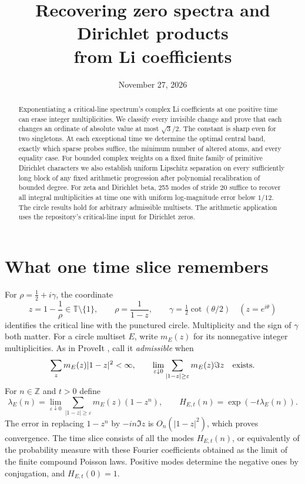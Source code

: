 \documentclass[11pt,letterpaper]{article}
\title{Recovering zero spectra and Dirichlet products\\from Li coefficients}
\author{}\date{November 27, 2026}
\newcommand{\Z}{\mathbb Z}
\newcommand{\T}{\mathbb T}
\begin{document}
\maketitle
\begin{abstract}
Exponentiating a critical-line spectrum's complex Li coefficients at one positive time can erase integer multiplicities. We classify every invisible change and prove that each changes an ordinate of absolute value at most $\sqrt3/2$. The constant is sharp even for two singletons. At each exceptional time we determine the optimal central band, exactly which sparse probes suffice, the minimum number of altered atoms, and every equality case. For bounded complex weights on a fixed finite family of primitive Dirichlet characters we also establish uniform Lipschitz separation on every sufficiently long block of any fixed arithmetic progression after polynomial recalibration of bounded degree. For zeta and Dirichlet beta, 255 modes of stride 20 suffice to recover all integral multiplicities at time one with uniform log-magnitude error below $1/12$. The circle results hold for arbitrary admissible multisets. The arithmetic application uses the repository's critical-line input for Dirichlet zeros.
\end{abstract}

\section{What one time slice remembers}

For $\rho=\tfrac12+i\gamma$, the coordinate
\[
 z=1-\frac1\rho\in\T\setminus\{1\},\qquad
 \rho=\frac{1}{1-z},\qquad
 \gamma=\tfrac12\cot(\theta/2)\quad(z=e^{i\theta})
\]
identifies the critical line with the punctured circle. Multiplicity and the sign of $\gamma$ both matter. For a circle multiset $E$, write $m_E(z)$ for its nonnegative integer multiplicities. As in ProveIt \cite{repo}, call it \emph{admissible} when
\[
 \sum_zm_E(z)|1-z|^2<\infty,\qquad
 \lim_{\varepsilon\downarrow0}\sum_{|1-z|\ge\varepsilon}m_E(z)\Im z
 \quad\hbox{exists}.
\]
For $n\in\Z$ and $t>0$ define
\begin{equation}\label{eq:obs}
 \lambda_E(n)=\lim_{\varepsilon\downarrow0}
 \sum_{|1-z|\ge\varepsilon}m_E(z)(1-z^n),
 \qquad H_{E,t}(n)=\exp(-t\lambda_E(n)).
\end{equation}
The error in replacing $1-z^n$ by $-in\Im z$ is $O_n(|1-z|^2)$, which proves convergence. The time slice consists of all the modes $H_{E,t}(n)$, or equivalently of the probability measure with these Fourier coefficients obtained as the limit of the finite compound Poisson laws. Positive modes determine the negative ones by conjugation, and $H_{E,t}(0)=1$.
\end{document}
